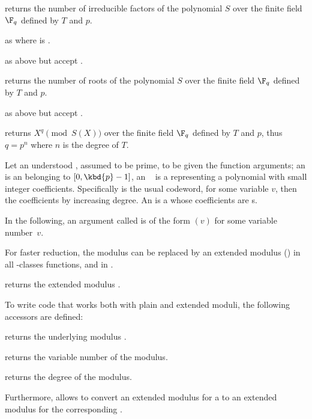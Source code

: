  returns the number of
irreducible factors of the polynomial $S$ over the finite field $\F_q$
defined by $T$ and $p$.

 as
 where  is .

 as above but accept .

 returns the number of roots of
the polynomial $S$ over the finite field $\F_q$ defined by $T$ and $p$.

 as above but accept .

 returns
$X^{q}\pmod{S(X)}$ over the finite field $\F_q$ defined by $T$ and $p$, thus
$q=p^n$ where $n$ is the degree of $T$.

 Let  an understood , assumed to be
prime, to be given the function arguments; an  is an 
belonging to $[0,\kbd{p}-1]$, an ~ is a 
representing a polynomial with small integer coefficients. Specifically
 is the usual codeword,  for some
variable $v$, then the coefficients by increasing degree. An  is a
 whose coefficients are s.

\noindent In the following, an argument called  is of the form
$(v)$ for some variable number~$v$.


For faster reduction, the modulus  can be replaced by an extended
modulus () in all -classes functions, and in
.

 returns the extended modulus .

To write code that works both with plain and extended moduli, the following
accessors are defined:

 returns the underlying modulus .

 returns the variable number of the modulus.

 returns the degree of the modulus.

Furthermore,  allows to convert an extended modulus for
a  to an extended modulus for the corresponding .

